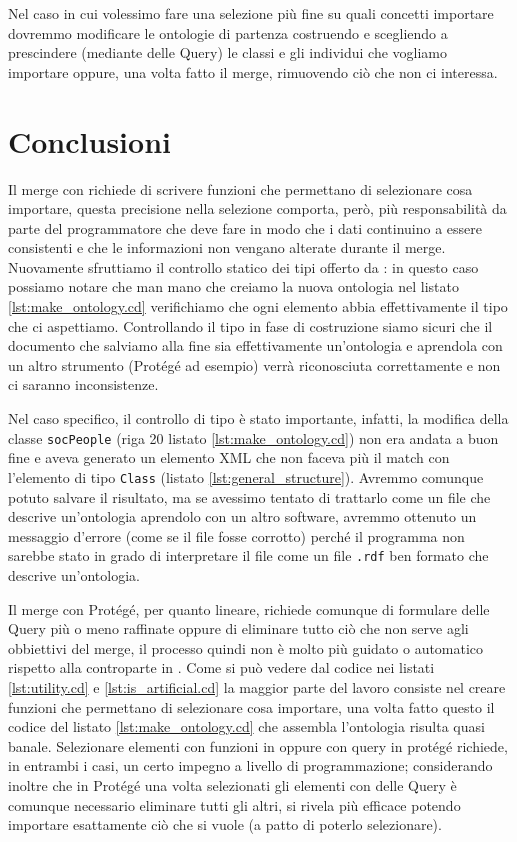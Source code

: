 Nel caso in cui volessimo fare una selezione più fine su quali concetti importare dovremmo modificare le ontologie di partenza costruendo e scegliendo a prescindere (mediante delle Query) le classi e gli individui che vogliamo importare oppure, una volta fatto il merge, rimuovendo ciò che non ci interessa.
\section{Conclusioni}
Il merge con \cduce richiede di scrivere funzioni che permettano di selezionare cosa importare, questa precisione nella selezione comporta, però, più responsabilità da parte del programmatore che deve fare in modo che i dati continuino a essere consistenti e che le informazioni non vengano alterate durante il merge. Nuovamente sfruttiamo il controllo statico dei tipi offerto da \cduce: in questo caso possiamo notare che man mano che creiamo la nuova ontologia nel listato \ref{lst:make_ontology.cd} verifichiamo che ogni elemento abbia effettivamente il tipo che ci aspettiamo. Controllando il tipo in fase di costruzione siamo sicuri che il documento che salviamo alla fine sia effettivamente un'ontologia e aprendola con un altro strumento (Protégé ad esempio) verrà riconosciuta correttamente e non ci saranno inconsistenze.

Nel caso specifico, il controllo di tipo è stato importante, infatti, la modifica della classe \verb|socPeople| (riga 20 listato \ref{lst:make_ontology.cd}) non era andata a buon fine e aveva generato un elemento XML che non faceva più il match con l'elemento di tipo \verb|Class| (listato \ref{lst:general_structure}). Avremmo comunque potuto salvare il risultato, ma se avessimo tentato di trattarlo come un file che descrive un'ontologia aprendolo con un altro software, avremmo ottenuto un messaggio d'errore (come se il file fosse corrotto) perché il programma non sarebbe stato in grado di interpretare il file come un file \verb|.rdf| ben formato che descrive un'ontologia.


Il merge con Protégé, per quanto lineare, richiede comunque di formulare delle Query più o meno raffinate oppure di eliminare tutto ciò che non serve agli obbiettivi del merge, il processo quindi non è molto più guidato o automatico rispetto alla controparte in \cduce. Come si può vedere dal codice nei listati \ref{lst:utility.cd} e \ref{lst:is_artificial.cd} la maggior parte del lavoro consiste nel creare funzioni che permettano di selezionare cosa importare, una volta fatto questo il codice del listato \ref{lst:make_ontology.cd} che assembla l'ontologia risulta quasi banale. Selezionare elementi con funzioni in \cduce oppure con query in protégé richiede, in entrambi i casi, un certo impegno a livello di programmazione; considerando inoltre che in Protégé una volta selezionati gli elementi con delle Query è comunque necessario eliminare tutti gli altri, \cduce si rivela più efficace potendo importare esattamente ciò che si vuole (a patto di poterlo selezionare).

